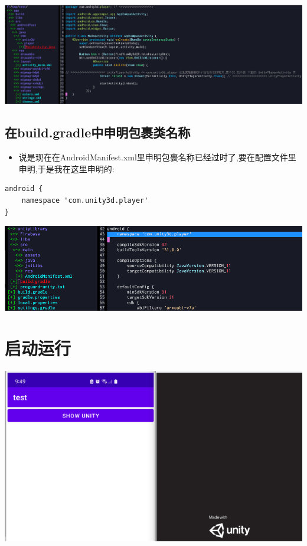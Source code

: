 \documentclass[9pt, b5paper]{article}
\begin{document}
\includegraphics[width=.9\linewidth]{./pic/unityToAndroid_20221123_223852.png}
\subsection{在build.gradle中申明包裹类名称}
\label{sec-4-6}
\begin{itemize}
\item 说是现在在AndroidManifest.xml里申明包裹名称已经过时了,要在配置文件里申明,于是我在这里申明的:
\end{itemize}
\begin{verbatim}
android {
    namespace 'com.unity3d.player'
}
\end{verbatim}

\includegraphics[width=.9\linewidth]{./pic/unityToAndroid_20221124_090438.png}

\section{启动运行}
\label{sec-5}

\includegraphics[width=.9\linewidth]{./pic/unityToAndroid_20221123_225517.png}
\end{document}
